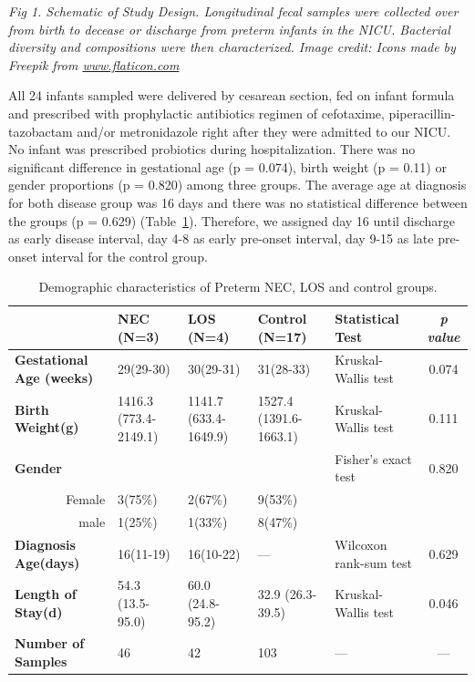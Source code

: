 \documentclass[fleqn,10pt]{wlpeerj} %
\begin{document}
     \emph{Fig 1. Schematic of Study Design. Longitudinal fecal samples were collected over from birth to decease or discharge from preterm infants in the NICU. Bacterial diversity and compositions were then characterized. Image credit: Icons made by Freepik from \href{www.flaticon.com}{www.flaticon.com}}

   All 24 infants sampled were delivered by cesarean section, fed on infant formula and prescribed with prophylactic antibiotics regimen of cefotaxime, piperacillin-tazobactam and/or metronidazole right after they were admitted to our NICU. No infant was prescribed probiotics during hospitalization. There was no significant difference in gestational age (p = 0.074), birth weight (p = 0.11) or gender proportions (p = 0.820) among three groups. The average age at diagnosis for both disease group was 16 days and there was no statistical difference between the groups (p = 0.629) (Table~\ref{tab:demographic}). Therefore, we assigned day 16 until discharge as early disease interval, day 4-8 as early pre-onset interval, day 9-15 as late pre-onset interval for the control group.
    \begin{table}[!hpb]
       \centering
       \caption{\label{tab:demographic}Demographic characteristics of Preterm NEC, LOS and control groups.}
      \begin{tabular}{lp{1.8cm}p{1.8cm}p{1.8cm}p{2cm}c}
        \toprule
          & \textbf{NEC (N=3)} & \textbf{LOS (N=4)} & \textbf{Control (N=17)} & \textbf{Statistical Test} & \textit{p value} \\ \midrule
        \textbf{Gestational Age (weeks)} & 29(29-30) & 30(29-31) & 31(28-33) & Kruskal-Wallis test & 0.074 \\
        \textbf{Birth Weight(g)} & 1416.3 (773.4-2149.1) & 1141.7 (633.4-1649.9) & 1527.4 (1391.6-1663.1) & Kruskal-Wallis test & 0.111 \\
        \textbf{Gender} &  &  &  & Fisher's exact test & 0.820 \\
        \multicolumn{1}{r}{Female} & 3(75\%) & 2(67\%) & 9(53\%) &  & \\
        \multicolumn{1}{r}{male} & 1(25\%) & 1(33\%) & 8(47\%) &  & \\
        \textbf{Diagnosis Age(days)} & 16(11-19) & 16(10-22) & — & Wilcoxon rank-sum test & 0.629 \\
        \textbf{Length of Stay(d)} & 54.3 (13.5-95.0) & 60.0 (24.8-95.2) & 32.9 (26.3-39.5) & Kruskal-Wallis test & 0.046 \\
        \textbf{Number of Samples} & 46 & 42 & 103 & — & — \\ \bottomrule
      \end{tabular}
    \end{table}
\end{document}
